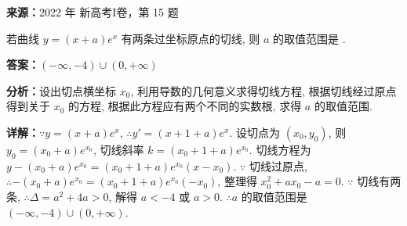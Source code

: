 \begin{question}[points=5]
\textbf{来源：}2022 年 新高考I卷，第 15 题\par
若曲线 $y = (x + a)e^x$ 有两条过坐标原点的切线, 则 $a$ 的取值范围是 .
\begin{solution}
\textbf{答案：}$(-\infty, -4) \cup (0, +\infty)$

\textbf{分析：}设出切点横坐标 $x_0$, 利用导数的几何意义求得切线方程, 根据切线经过原点得到关于 $x_0$ 的方程, 根据此方程应有两个不同的实数根, 求得 $a$ 的取值范围.

\textbf{详解：}$\because y = (x + a)e^x$, $\therefore y' = (x + 1 + a)e^x$. 设切点为 $(x_0, y_0)$, 则 $y_0 = (x_0 + a)e^{x_0}$, 切线斜率 $k = (x_0 + 1 + a)e^{x_0}$. 切线方程为 $y - (x_0 + a)e^{x_0} = (x_0 + 1 + a)e^{x_0}(x - x_0)$. $\because$ 切线过原点, $\therefore -(x_0 + a)e^{x_0} = (x_0 + 1 + a)e^{x_0}(-x_0)$, 整理得 $x_0^2 + a x_0 - a = 0$. $\because$ 切线有两条, $\therefore \Delta = a^2 + 4a > 0$, 解得 $a < -4$ 或 $a > 0$. $\therefore a$ 的取值范围是 $(-\infty, -4) \cup (0, +\infty)$.
\end{solution}
\end{question}


